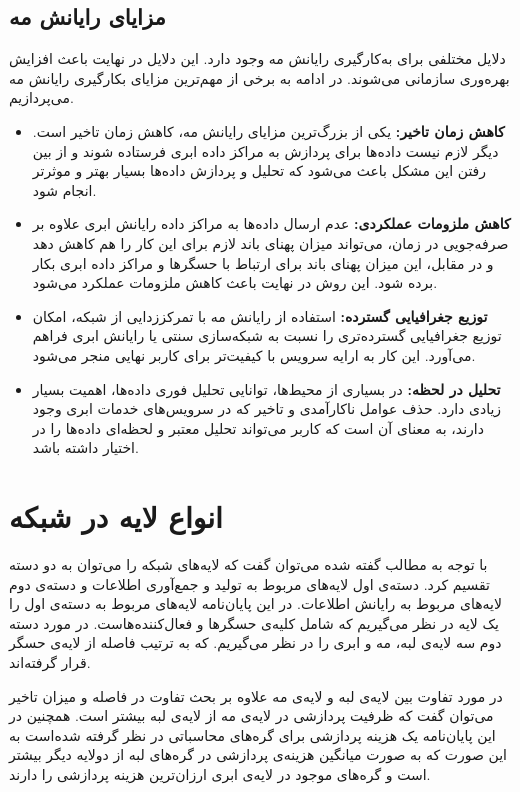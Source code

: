   \subsection{مزایای رایانش مه}
  دلایل مختلفی برای به‌کارگیری رایانش مه وجود دارد. این دلایل در نهایت باعث افزایش بهره‌وری سازمانی می‌شوند. در ادامه به برخی از مهم‌ترین مزایای بکارگیری رایانش مه می‌پردازیم.
  \begin{itemize}
  \item \textbf{کاهش زمان تاخیر:}
  یکی از بزرگ‌ترین مزایای رایانش مه، کاهش زمان تاخیر است. دیگر لازم نیست داده‌ها برای پردازش به مراکز داده ابری فرستاده شوند و از بین رفتن این مشکل باعث می‌شود که تحلیل و پردازش داده‌ها بسیار بهتر و موثرتر انجام شود.
  
  \item \textbf{کاهش ملزومات عملکردی:}
  عدم ارسال داده‌ها به مراکز داده رایانش ابری علاوه بر صرفه‌جویی در زمان، می‌تواند میزان پهنای باند لازم برای این کار را هم کاهش دهد و در مقابل، این میزان پهنای باند برای ارتباط با حسگرها و مراکز داده ابری بکار برده شود. این روش در نهایت باعث کاهش ملزومات عملکرد می‌شود.
  
  \item \textbf{توزیع جغرافیایی گسترده:}
  استفاده از رایانش مه با تمرکززدایی از شبکه، امکان توزیع جغرافیایی گسترده‌تری را نسبت به شبکه‌سازی سنتی یا رایانش ابری فراهم می‌آورد. این کار به ارایه سرویس با کیفیت‌تر برای کاربر نهایی منجر می‌شود.
  
  \item \textbf{تحلیل در لحظه:}
  در بسیاری از محیط‌ها، توانایی تحلیل فوری داده‌ها، اهمیت بسیار زیادی دارد. حذف عوامل ناکارآمدی و تاخیر که در سرویس‌های خدمات ابری وجود دارند، به معنای آن است که کاربر می‌تواند تحلیل معتبر و لحظه‌ای داده‌ها را در اختیار داشته باشد.
    \end{itemize}
  
  \section{انواع لایه در شبکه}
  با توجه به مطالب گفته شده می‌توان گفت که لایه‌های شبکه را می‌توان به دو دسته تقسیم کرد. دسته‌ی اول لایه‌های مربوط به تولید و جمع‌آوری اطلاعات و دسته‌ی دوم لایه‌های مربوط به رایانش اطلاعات.
  در این پایان‌نامه لایه‌های مربوط به دسته‌ی اول را یک لایه در نظر می‌گیریم که شامل کلیه‌ی حسگرها و فعال‌کننده‌هاست. در مورد دسته دوم سه لایه‌ی لبه، مه و ابری را در نظر می‌گیریم. که به ترتیب فاصله از لایه‌ی حسگر قرار گرفته‌اند.   
 
  در مورد تفاوت بین لایه‌ی لبه و لایه‌ی مه  علاوه بر بحث تفاوت در فاصله و میزان تاخیر می‌توان گفت که ظرفیت پردازشی در لایه‌ی مه از لایه‌ی لبه بیشتر است. همچنین در این پایان‌نامه یک هزینه پردازشی برای گره‌های محاسباتی در نظر گرفته شده‌است به این صورت که به صورت میانگین هزینه‌ی پردازشی در گره‌های لبه از دولایه دیگر بیشتر است و گره‌های موجود در لایه‌ی ابری ارزان‌ترین هزینه پردازشی را دارند. 
  
